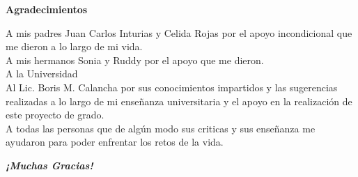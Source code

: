 \begin{center}
{\Large \textbf{Agradecimientos}}\\[2cm]
{\leftskip=8cm
A mis padres Juan Carlos Inturias y Celida Rojas por el apoyo incondicional que me dieron a lo largo de mi vida.\\
A mis hermanos Sonia y Ruddy por el apoyo que me dieron.\\
A la Universidad\\
Al Lic. Boris M. Calancha por sus conocimientos impartidos y las sugerencias realizadas a lo largo de mi enseñanza universitaria y el apoyo en la realización de este proyecto de grado.\\
A todas las personas que de algún modo sus criticas y sus enseñanza me ayudaron para poder enfrentar los retos de la vida.\\[3cm]
\par}
\textbf{\textit{¡Muchas Gracias!}}
\end{center}